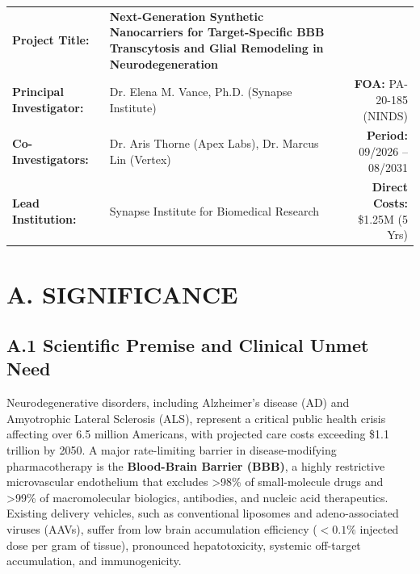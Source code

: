 \documentclass[11pt,letterpaper]{article}
\begin{document}
\begin{summarybox}
\small
\begin{tabular}{@{}l p{10cm} r@{}}
\textbf{Project Title:} & \textbf{Next-Generation Synthetic Nanocarriers for Target-Specific BBB Transcytosis and Glial Remodeling in Neurodegeneration} & \\
\textbf{Principal Investigator:} & Dr. Elena M. Vance, Ph.D. (Synapse Institute) & \textbf{FOA:} PA-20-185 (NINDS) \\
\textbf{Co-Investigators:} & Dr. Aris Thorne (Apex Labs), Dr. Marcus Lin (Vertex) & \textbf{Period:} 09/2026 -- 08/2031 \\
\textbf{Lead Institution:} & Synapse Institute for Biomedical Research & \textbf{Direct Costs:} \$1.25M (5 Yrs) \\
\end{tabular}
\end{summarybox}

\vspace{-4pt}

\section{A. SIGNIFICANCE}

\subsection{A.1 Scientific Premise and Clinical Unmet Need}
Neurodegenerative disorders, including Alzheimer's disease (AD) and Amyotrophic Lateral Sclerosis (ALS), represent a critical public health crisis affecting over 6.5 million Americans, with projected care costs exceeding \$1.1 trillion by 2050. A major rate-limiting barrier in disease-modifying pharmacotherapy is the \textbf{Blood-Brain Barrier (BBB)}, a highly restrictive microvascular endothelium that excludes >98\% of small-molecule drugs and >99\% of macromolecular biologics, antibodies, and nucleic acid therapeutics. Existing delivery vehicles, such as conventional liposomes and adeno-associated viruses (AAVs), suffer from low brain accumulation efficiency ($<0.1\%$ injected dose per gram of tissue), pronounced hepatotoxicity, systemic off-target accumulation, and immunogenicity.
\end{document}
